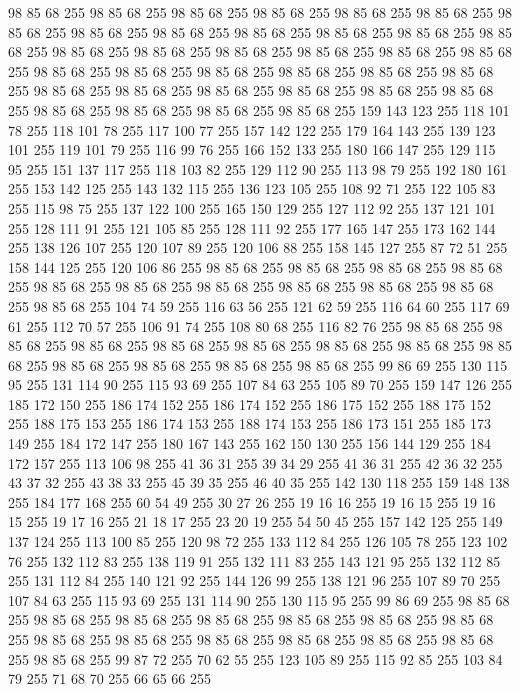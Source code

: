 98 85 68 255 98 85 68 255 98 85 68 255 98 85 68 255 98 85 68 255 98 85 68 255 98 85 68 255 98 85 68 255 98 85 68 255 98 85 68 255 98 85 68 255 98 85 68 255 98 85 68 255 98 85 68 255 98 85 68 255 98 85 68 255 98 85 68 255 98 85 68 255 98 85 68 255 98 85 68 255 98 85 68 255 98 85 68 255 98 85 68 255 98 85 68 255 98 85 68 255 98 85 68 255 98 85 68 255 98 85 68 255 98 85 68 255 98 85 68 255 98 85 68 255 98 85 68 255 98 85 68 255 98 85 68 255 98 85 68 255 159 143 123 255 118 101 78 255 118 101 78 255 117 100 77 255 157 142 122 255 179 164 143 255 139 123 101 255 119 101 79 255 116 99 76 255 166 152 133 255 180 166 147 255 129 115 95 255 151 137 117 255 118 103 82 255 129 112 90 255 113 98 79 255 192 180 161 255 153 142 125 255 143 132 115 255 136 123 105 255 108 92 71 255 122 105 83 255 115 98 75 255 137 122 100 255 165 150 129 255 127 112 92 255 137 121 101 255 128 111 91 255 121 105 85 255
128 111 92 255 177 165 147 255 173 162 144 255 138 126 107 255 120 107 89 255 120 106 88 255 158 145 127 255 87 72 51 255 158 144 125 255 120 106 86 255 98 85 68 255 98 85 68 255 98 85 68 255 98 85 68 255 98 85 68 255 98 85 68 255 98 85 68 255 98 85 68 255 98 85 68 255 98 85 68 255 98 85 68 255 104 74 59 255 116 63 56 255 121 62 59 255 116 64 60 255 117 69 61 255 112 70 57 255 106 91 74 255 108 80 68 255 116 82 76 255 98 85 68 255 98 85 68 255 98 85 68 255 98 85 68 255 98 85 68 255 98 85 68 255 98 85 68 255 98 85 68 255 98 85 68 255 98 85 68 255 98 85 68 255 98 85 68 255 99 86 69 255 130 115 95 255 131 114 90 255 115 93 69 255 107 84 63 255 105 89 70 255 159 147 126 255 185 172 150 255 186 174 152 255 186 174 152 255 186 175 152 255 188 175 152 255 188 175 153 255 186 174 153 255 188 174 153 255 186 173 151 255 185 173 149 255 184 172 147 255 180 167 143 255 162 150 130 255 156 144 129 255 184 172 157 255
113 106 98 255 41 36 31 255 39 34 29 255 41 36 31 255 42 36 32 255 43 37 32 255 43 38 33 255 45 39 35 255 46 40 35 255 142 130 118 255 159 148 138 255 184 177 168 255 60 54 49 255 30 27 26 255 19 16 16 255 19 16 15 255 19 16 15 255 19 17 16 255 21 18 17 255 23 20 19 255 54 50 45 255 157 142 125 255 149 137 124 255 113 100 85 255 120 98 72 255 133 112 84 255 126 105 78 255 123 102 76 255 132 112 83 255 138 119 91 255 132 111 83 255 143 121 95 255 132 112 85 255 131 112 84 255 140 121 92 255 144 126 99 255 138 121 96 255 107 89 70 255 107 84 63 255 115 93 69 255 131 114 90 255 130 115 95 255 99 86 69 255 98 85 68 255 98 85 68 255 98 85 68 255 98 85 68 255 98 85 68 255 98 85 68 255 98 85 68 255 98 85 68 255 98 85 68 255 98 85 68 255 98 85 68 255 98 85 68 255 98 85 68 255 98 85 68 255 99 87 72 255 70 62 55 255 123 105 89 255 115 92 85 255 103 84 79 255 71 68 70 255 66 65 66 255
